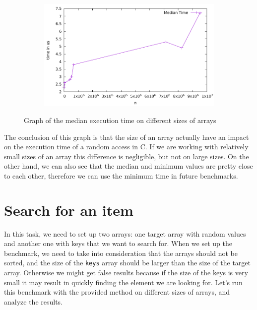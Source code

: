 \documentclass[a4paper,11pt]{article}
\begin{document}
\begin{figure}[h]
  \centering
  \begin{subfigure}[b]{.5\textwidth}
    \centering
    \includegraphics[width=\textwidth]{./median/data} %
  \end{subfigure}
  \caption{Graph of the median execution time on different sizes of arrays}
  \label{fig:graph_3}
\end{figure}

The conclusion of this graph is that the size of an array actually have an impact on the execution time of a random access in C.
If we are working with relatively small sizes of an array this difference is negligible, but not on large sizes.
On the other hand, we can also see that the median and minimum values are pretty close to each other, therefore we can use the minimum time in future benchmarks.

\section*{Search for an item}

In this task, we need to set up two arrays: one target array with random values and another one with keys that we want to search for.
When we set up the benchmark, we need to take into consideration that the arrays should not be sorted, and the size of the {\tt keys} array should be larger than the size of the target array.
Otherwise we might get false results because if the size of the keys is very small it may result in quickly finding the element we are looking for.
Let's run this benchmark with the provided method on different sizes of arrays, and analyze the results.
\end{document}
